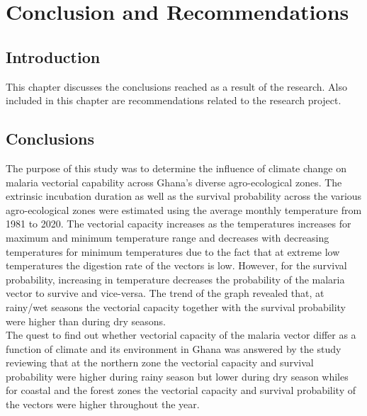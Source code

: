 \label{chapter5}


\chapter{Conclusion and Recommendations}
\section{Introduction}
This chapter discusses the conclusions reached as a result of the research. Also included in this chapter are recommendations related to the research project.



\section{Conclusions}
The purpose of this study was to determine the influence of climate change on malaria vectorial capability across Ghana's diverse agro-ecological zones. The extrinsic incubation duration as well as the survival probability across the various agro-ecological zones were estimated using the average monthly temperature from 1981 to 2020.
The vectorial capacity increases as the temperatures increases for maximum and minimum temperature range and decreases with decreasing temperatures for minimum temperatures due to the fact that at extreme low temperatures the digestion rate of the vectors is low. However, for the survival probability, increasing in temperature decreases the probability of the malaria vector to survive and vice-versa.
The trend of the graph revealed that, at rainy/wet seasons the vectorial capacity together with the survival probability were higher than during dry seasons.\\

\noindent The quest to find out whether vectorial capacity of the malaria vector differ as a function of climate and its environment in Ghana was answered by the study reviewing that at the northern zone the vectorial capacity and survival probability were higher during rainy season but lower during dry season whiles for coastal and the forest zones the vectorial capacity and survival probability of the vectors were higher throughout the year.\\

